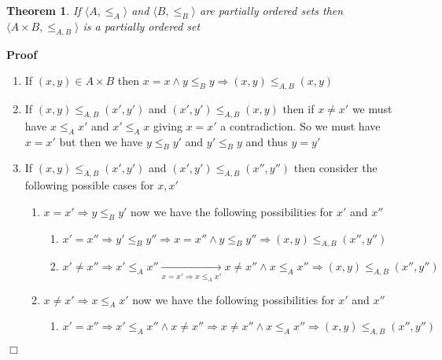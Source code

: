 \documentclass{book}
\newcommand{\Rightarrowlim}{\mathop{\rightarrow}\limits}
\newenvironment{proof}{\noindent\textbf{Proof\ }}{\hspace*{\fill}$\Box$\medskip}
\newtheorem{theorem}{Theorem}
\begin{document}
{{\begin{theorem}
  \label{lexical order}If $\langle A, \leqslant_A \rangle$ and $\langle B,
  \leqslant_B \rangle$ are partially ordered sets then $\langle A \times B,
  \leqslant_{A, B} \rangle$ is a partially ordered set
\end{theorem}

\begin{proof}
  
  \begin{enumerate}
    \item If $(x, y) \in A \times B$ then $x = x \wedge y \leqslant_B y
    \Rightarrow (x, y) \leqslant_{A, B} (x, y)$
    
    \item If $(x, y) \leqslant_{A, B} (x', y')$ and $(x', y') \leqslant_{A, B}
    (x, y)$ then if $x \neq x'$ we must have $x \leqslant_A x'$ and $x'
    \leqslant_A x$ giving $x = x'$ a contradiction. So we must have $x = x'$
    but then we have $y \leqslant_B y'$ and $y' \leqslant_B y$ and thus $y =
    y'$
    
    \item If $(x, y) \leqslant_{A, B} (x', y')$ and $(x', y') \leqslant_{A, B}
    (x'', y'')$ then consider the following possible cases for $x, x'$
    \begin{enumerate}
      \item $x = x' \Rightarrow y \leqslant_B y'$ now we have the following
      possibilities for $x'$ and $x''$
      \begin{enumerate}
        \item $x' = x'' \Rightarrow y' \leqslant_B y'' \Rightarrow x = x''
        \wedge y \leqslant_B y'' \Rightarrow (x, y) \leqslant_{A, B} (x'',
        y'')$
        
        \item $x' \neq x'' \Rightarrow x' \leqslant_A x'' \Rightarrowlim_{x =
        x' \Rightarrow x \leqslant_A x'} x \neq x'' \wedge x \leqslant_A x''
        \Rightarrow (x, y) \leqslant_{A, B} (x'', y'')$
      \end{enumerate}
      \item $x \neq x' \Rightarrow x \leqslant_A x'$ now we have the following
      possibilities for $x'$ and $x''$
      \begin{enumerate}
        \item $x' = x'' \Rightarrow x' \leqslant_A x'' \wedge x \neq x''
        \Rightarrow x \neq x'' \wedge x \leqslant_A x'' \Rightarrow (x, y)
        \leqslant_{A, B} (x'', y'')$
        

\end{enumerate}
\end{enumerate}
\end{enumerate}
\end{proof}}}
\end{document}

